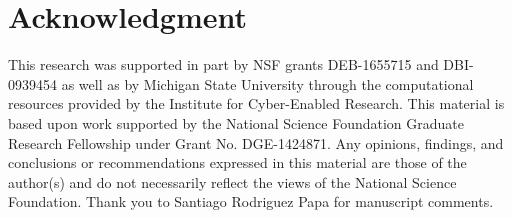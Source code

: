 \section*{Acknowledgment}


This research was supported in part by NSF grants DEB-1655715 and DBI-0939454 as well as by Michigan State University through the computational resources provided by the Institute for Cyber-Enabled Research.
This material is based upon work supported by the National Science Foundation Graduate Research Fellowship under Grant No. DGE-1424871.
Any opinions, findings, and conclusions or recommendations expressed in this material are those of the author(s) and do not necessarily reflect the views of the National Science Foundation.
Thank you to Santiago Rodriguez Papa for manuscript comments.